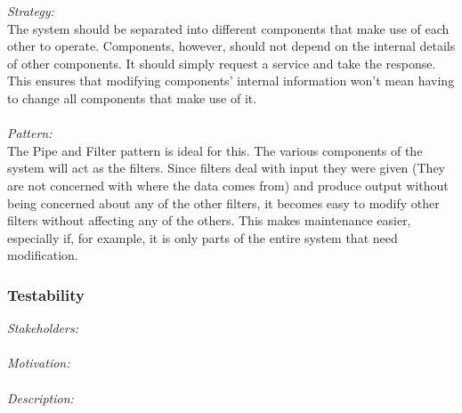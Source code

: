 \documentclass[a4paper,12pt]{report}
\begin{document}
		\emph{Strategy: }\\ The system should be separated into different components that make use of each other to operate. Components, however, should not depend on the internal details of other components. It should simply request a service and take the response. This ensures that modifying components’ internal information won’t mean having to change all components that make use of it. \\
		\\\emph{Pattern: }\\ The Pipe and Filter pattern is ideal for this. The various components of the system will act as the filters. Since filters deal with input they were given (They are not concerned with where the data comes from) and produce output without being concerned about any of the other filters, it becomes easy to modify other filters without affecting any of the others. This makes maintenance easier, especially if, for example, it is only parts of the entire system that need modification.		
			
		\subsubsection{Testability}
		\emph{Stakeholders: }\\ 
		\\\emph{Motivation: }\\
		\\\emph{Description: }\\
\end{document}
